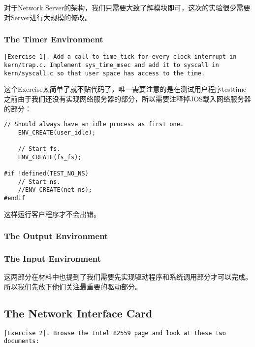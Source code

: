 \documentclass{article}
\begin{document}
\begin{CJK*}{UTF8}{gkai}
对于Network Server的架构，我们只需要大致了解模块即可，这次的实验很少需要对Server进行大规模的修改。

\subsubsection{The Timer Environment}

\begin{lstlisting}[style=exercise]
|Exercise 1|. Add a call to time_tick for every clock interrupt in kern/trap.c. Implement sys_time_msec and add it to syscall in kern/syscall.c so that user space has access to the time.
\end{lstlisting}

这个Exercise太简单了就不贴代码了，唯一需要注意的是在测试用户程序testtime之前由于我们还没有实现网络服务器的部分，所以需要注释掉JOS载入网络服务器的部分：

\begin{lstlisting}[style=ccode, title={\scriptsize \ttfamily \bfseries kern/init.c: i386\_init()}]
	// Should always have an idle process as first one.
	ENV_CREATE(user_idle);

	// Start fs.
	ENV_CREATE(fs_fs);

#if !defined(TEST_NO_NS)
	// Start ns.
	//ENV_CREATE(net_ns);
#endif
\end{lstlisting}

这样运行客户程序才不会出错。


\subsubsection{The Output Environment}

\label{outputhelp}

\subsubsection{The Input Environment}

这两部分在材料中也提到了我们需要先实现驱动程序和系统调用部分才可以完成。所以我们先放下他们关注最重要的驱动部分。

\subsection{The Network Interface Card}


\begin{lstlisting}[style=exercise]
|Exercise 2|. Browse the Intel 82559 page and look at these two documents:


\end{lstlisting}
\end{CJK*}
\end{document}
